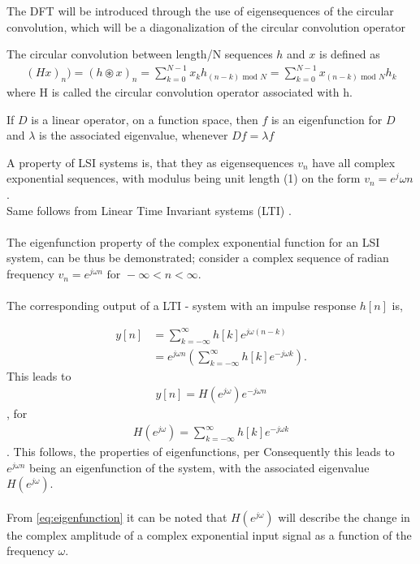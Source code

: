 The DFT will be introduced through the use of eigensequences of the circular convolution, which will be a diagonalization of the circular convolution operator

\begin{definition}
 	The circular convolution between length/N sequences $h$ and $x$ is defined as
\begin{align*}
	(Hx)_n) = (h \circledast x)_n = \sum_{k = 0}^{N-1} x_k h_{(n-k) \text{ mod $N$}} =\sum_{k = 0}^{N-1} x_{(n-k) \text{ mod $N$}} h_k
\end{align*}
where H is called the circular convolution operator associated with h.
\end{definition} \cite{FSP}

\begin{definition}[Eigenfunction]
	If $D$ is a linear operator, on a function space, then $f$ is an eigenfunction for $D$ and $\lambda$ is the associated eigenvalue, whenever $Df = \lambda f$
\end{definition}
\cite{Eigenfunctions}

A property of LSI systems is, that they as eigensequences $v_n$ have all complex exponential sequences, with modulus being unit length (1) on the form $v_n = e^j \omega n$ \cite{FSP}.\\ Same follows from Linear Time Invariant systems (LTI) \cite{DTSP}.
\\\\
The eigenfunction property of the complex exponential function for an LSI system, can be thus be demonstrated; consider a complex sequence of radian frequency $v_n = e^{j\omega n} \text{ for } -\infty < n < \infty$.
\\\\
The corresponding output of a LTI - system with an impulse response $h[n]$ is,

\begin{align*}
y[n] 
&= \sum_{k=-\infty}^{\infty} h[k]e^{j\omega(n-k)} \nonumber \\ 
&= e^{j\omega n} \left(\sum_{k=-\infty}^{\infty} h[k]e^{-j\omega k} \right).
\end{align*}
This leads to
\begin{align}\label{eq:eigenfunction}
y[n] = H(e^{j \omega}) e^{-j\omega n}
\end{align}
,
for
\begin{align*}
H(e^{j\omega}) = \sum_{k=-\infty}^{\infty} h[k]e^{-j\omega k} 
\end{align*}.
This follows, the properties of eigenfunctions, per 
Consequently this leads to $e^{j\omega n}$ being an eigenfunction of the system, with the associated eigenvalue $H(e^{j\omega})$.
\\\\
From \eqref{eq:eigenfunction} it can be noted that $H(e^{j\omega})$ will describe the change in the complex amplitude of a complex exponential input signal as a function of the frequency $\omega$. \cite{DTSP} 



